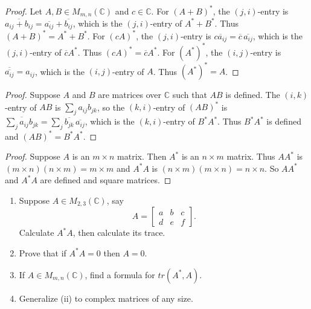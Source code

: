 \begin{proof}
    Let $A, B \in M_{m,n}(\mathbb{C})$ and $c \in \mathbb{C}$.
    For $(A + B)^*$, the $(j,i)$-entry is $\overline{a_{ij} + b_{ij}} = \overline{a_{ij}} + \overline{b_{ij}}$,
    which is the $(j,i)$-entry of $A^* + B^*$. Thus $(A+B)^* = A^* + B^*$.
    For $(cA)^*$, the $(j,i)$-entry is $\overline{ca_{ij}} = \overline{c}\,\overline{a_{ij}}$,
    which is the $(j,i)$-entry of $\overline{c}A^*$. Thus $(cA)^* = \overline{c}A^*$.
    For $(A^*)^*$, the $(i,j)$-entry is $\overline{\overline{a_{ij}}} = a_{ij}$,
    which is the $(i,j)$-entry of $A$. Thus $(A^*)^* = A$.
\end{proof}

\begin{proof}
    Suppose $A$ and $B$ are matrices over $\mathbb{C}$ such that $AB$ is defined.
    The $(i,k)$-entry of $AB$ is $\sum_j a_{ij} b_{jk}$, so the $(k,i)$-entry of $(AB)^*$ is
    $\overline{\sum_j a_{ij} b_{jk}} = \sum_j \overline{b_{jk}}\,\overline{a_{ij}}$,
    which is the $(k,i)$-entry of $B^* A^*$.
    Thus $B^* A^*$ is defined and $(AB)^* = B^* A^*$.
\end{proof}

\begin{proof}
    Suppose $A$ is an $m \times n$ matrix.
    Then $A^*$ is an $n \times m$ matrix.
    Thus $AA^*$ is $(m \times n)(n \times m) = m \times m$
        and $A^*A$ is $(n \times m)(m \times n) = n \times n$.
    So $AA^*$ and $A^*A$ are defined and square matrices.
\end{proof}


\begin{tcolorbox}[title=Exercise 4, breakable]
    \begin{enumerate}
        \item Suppose $A \in M_{2, 3}(\mathbb{C})$, say 
        \[A = 
        \begin{bmatrix}
            a & b & c \\
            d & e & f
        \end{bmatrix}.
        \]
        Calculate $A^* A$, then calculate its trace.
        \item Prove that if $A^* A = 0$ then $A = 0$.
        \item If $A \in M_{m, n}(\mathbb{C})$, find a formula for $tr(A^*, A)$.
        \item Generalize (ii) to complex matrices of any size.
    \end{enumerate}
\end{tcolorbox}

